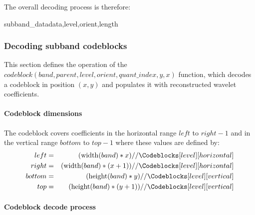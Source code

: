 \begin{figure}
[Include codeblock figure \label{codeblocks}]
\end{figure}

The overall decoding process is therefore:

\begin{pseudo}{subband\_data}{data,level,orient,length}
    \bsEND
\bsEND
{}
\end{pseudo}

\subsubsection{Decoding subband codeblocks}

\label{codeblocks}

This section defines the operation of the 
$codeblock(band,parent,level, orient,quant\_index,y,x)$ function, which decodes a 
codeblock in position $(x,y)$ and populates it with reconstructed 
wavelet coefficients.

\begin{comment}
[Include a figure here]
\end{comment}

\paragraph{Codeblock dimensions\newline}

The codeblock covers coefficients in the horizontal range $left$ to $right-1$ and in the vertical
range $bottom$ to $top-1$ where these values are defined by:
\begin{eqnarray*}
  left & = & (\width(band)*x)//\Codeblocks[level][horizontal] \\
  right & = & (\width(band)*(x+1))//\Codeblocks[level][horizontal] \\
  bottom & = & (\height(band)*y)//\Codeblocks[level][vertical] \\
  top & = & (\height(band)*(y+1))//\Codeblocks[level][vertical]
\end{eqnarray*}

\paragraph{Codeblock decode process\newline}

